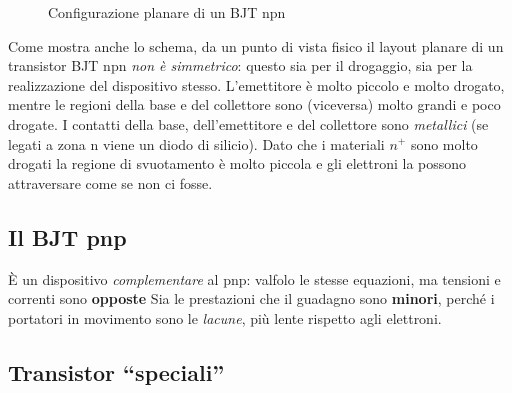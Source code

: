 \documentclass[
]{book}
\begin{document}
\begin{figure}[H]
\centering
{}%
\centering
\caption{Configurazione planare di un BJT npn}
\label{fig:my_label}
\end{figure}

Come mostra anche lo schema, da un punto di vista fisico il layout
planare di un transistor BJT npn \emph{non è simmetrico}: questo sia per
il drogaggio, sia per la realizzazione del dispositivo stesso.
L'emettitore è molto piccolo e molto drogato, mentre le regioni della
base e del collettore sono (viceversa) molto grandi e poco drogate.
\newline I contatti della base, dell'emettitore e del collettore sono
\emph{metallici} (se legati a zona n viene un diodo di silicio). Dato
che i materiali \(n^{+}\) sono molto drogati la regione di svuotamento è
molto piccola e gli elettroni la possono attraversare come se non ci
fosse.

\subsection{Il BJT pnp}\label{il-bjt-pnp}

È un dispositivo \emph{complementare} al pnp: valfolo le stesse
equazioni, ma tensioni e correnti sono \textbf{opposte} \newline Sia le
prestazioni che il guadagno sono \textbf{minori}, perché i portatori in
movimento sono le \emph{lacune}, più lente rispetto agli elettroni.

\subsection{Transistor ``speciali''}\label{transistor-speciali}
\end{document}

